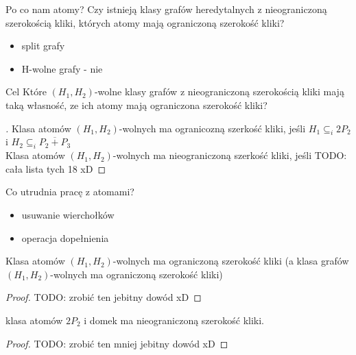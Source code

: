 \documentclass[polish]{beamer}
\begin{document}
\begin{frame}{Po co nam atomy?}
    Czy istnieją klasy grafów heredytalnych z nieograniczoną szerokością kliki, których atomy mają ograniczoną szerokość kliki?
    \begin{itemize}
        \item split grafy
        \item H-wolne grafy - nie
    \end{itemize}
\end{frame}

\begin{frame}{Cel}
    Które $(H_1, H_2)$-wolne klasy grafów z nieograniczoną szerokością kliki mają taką własność, ze ich atomy mają ograniczona szerokość kliki?
    \pause 
    \begin{proof}[]
        \renewcommand{\qedsymbol}{}
        Klasa atomów $(H_1, H_2)$-wolnych ma ogranicozną szerkość kliki, jeśli
        $H_1 \subseteq_i 2P_2$ i $ H_2 \subseteq_i \overline{P_2 + P_3}$ \\
        \pause
        Klasa atomów $(H_1, H_2)$-wolnych ma nieograniczoną szerkość kliki, jeśli
        TODO: cała lista tych 18 xD
    \end{proof}
\end{frame}

\begin{frame}{Co utrudnia pracę z atomami?}
    \begin{itemize}
        \item usuwanie wierchołków
        \item operacja dopełnienia
    \end{itemize}
\end{frame}

\begin{frame}
    \begin{theorem}
        Klasa atomów $(H_1, H_2)$-wolnych ma ograniczoną szerokość kliki (a klasa grafów $(H_1, H_2)$-wolnych ma ograniczoną szerokość kliki)
    \end{theorem}
    \begin{proof}
        \renewcommand{\qedsymbol}{}
        TODO: zrobić ten jebitny dowód xD
    \end{proof}
\end{frame}

\begin{frame}
    \begin{theorem}
        klasa atomów $2P_2$ i domek ma nieograniczoną szerokość kliki.
    \end{theorem}
    \begin{proof}
        \renewcommand{\qedsymbol}{}
        TODO: zrobić ten mniej jebitny dowód xD
    \end{proof}
\end{frame}
\end{document}
